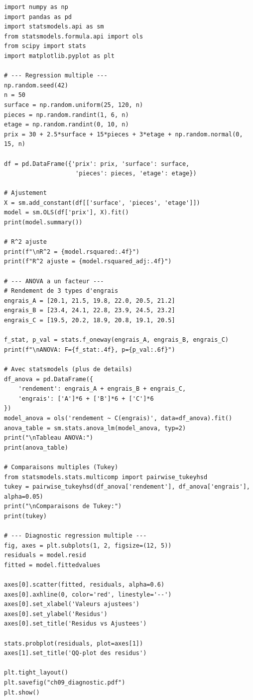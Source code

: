 \begin{python}
\begin{verbatim}
import numpy as np
import pandas as pd
import statsmodels.api as sm
from statsmodels.formula.api import ols
from scipy import stats
import matplotlib.pyplot as plt

# --- Regression multiple ---
np.random.seed(42)
n = 50
surface = np.random.uniform(25, 120, n)
pieces = np.random.randint(1, 6, n)
etage = np.random.randint(0, 10, n)
prix = 30 + 2.5*surface + 15*pieces + 3*etage + np.random.normal(0, 15, n)

df = pd.DataFrame({'prix': prix, 'surface': surface,
                    'pieces': pieces, 'etage': etage})

# Ajustement
X = sm.add_constant(df[['surface', 'pieces', 'etage']])
model = sm.OLS(df['prix'], X).fit()
print(model.summary())

# R^2 ajuste
print(f"\nR^2 = {model.rsquared:.4f}")
print(f"R^2 ajuste = {model.rsquared_adj:.4f}")

# --- ANOVA a un facteur ---
# Rendement de 3 types d'engrais
engrais_A = [20.1, 21.5, 19.8, 22.0, 20.5, 21.2]
engrais_B = [23.4, 24.1, 22.8, 23.9, 24.5, 23.2]
engrais_C = [19.5, 20.2, 18.9, 20.8, 19.1, 20.5]

f_stat, p_val = stats.f_oneway(engrais_A, engrais_B, engrais_C)
print(f"\nANOVA: F={f_stat:.4f}, p={p_val:.6f}")

# Avec statsmodels (plus de details)
df_anova = pd.DataFrame({
    'rendement': engrais_A + engrais_B + engrais_C,
    'engrais': ['A']*6 + ['B']*6 + ['C']*6
})
model_anova = ols('rendement ~ C(engrais)', data=df_anova).fit()
anova_table = sm.stats.anova_lm(model_anova, typ=2)
print("\nTableau ANOVA:")
print(anova_table)

# Comparaisons multiples (Tukey)
from statsmodels.stats.multicomp import pairwise_tukeyhsd
tukey = pairwise_tukeyhsd(df_anova['rendement'], df_anova['engrais'], alpha=0.05)
print("\nComparaisons de Tukey:")
print(tukey)

# --- Diagnostic regression multiple ---
fig, axes = plt.subplots(1, 2, figsize=(12, 5))
residuals = model.resid
fitted = model.fittedvalues

axes[0].scatter(fitted, residuals, alpha=0.6)
axes[0].axhline(0, color='red', linestyle='--')
axes[0].set_xlabel('Valeurs ajustees')
axes[0].set_ylabel('Residus')
axes[0].set_title('Residus vs Ajustees')

stats.probplot(residuals, plot=axes[1])
axes[1].set_title('QQ-plot des residus')

plt.tight_layout()
plt.savefig("ch09_diagnostic.pdf")
plt.show()
\end{verbatim}
\end{python}

